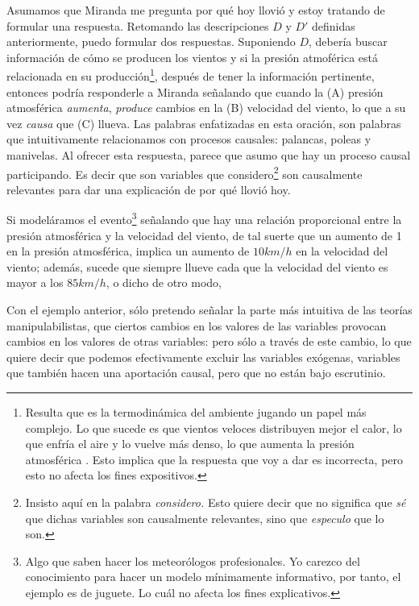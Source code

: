 Asumamos que Miranda me pregunta por qué hoy llovió y estoy
tratando de formular una respuesta. Retomando las
descripciones $ D $ y $ D' $ definidas anteriormente, puedo
formular dos respuestas. Suponiendo $ D $, debería buscar
información de cómo se producen los vientos y si la presión
atmoférica está relacionada en su producción\footnote{
  Resulta que es la termodinámica del ambiente jugando un
  papel más complejo. Lo que sucede es que vientos veloces
  distribuyen mejor el calor, lo que enfría el aire y lo
  vuelve más denso, lo que aumenta la presión atmosférica
  \parencite{Spiridonov2021}. Esto implica que la respuesta
  que voy a dar es incorrecta, pero esto no afecta los fines
  expositivos. 
},
después de tener la información pertinente, entonces podría
responderle a Miranda señalando que cuando la (A) presión
atmosférica \emph{aumenta}, \emph{produce} cambios en la (B)
velocidad del viento, lo que a su vez \emph{causa} que (C)
llueva. Las palabras enfatizadas en esta oración, son
palabras que intuitivamente relacionamos con procesos
causales: palancas, poleas y manivelas. Al ofrecer esta
respuesta, parece que asumo que hay un proceso causal
participando. Es decir que son variables que
considero\footnote{ 
  Insisto aquí en la palabra \emph{considero.} Esto quiere
  decir que no significa que \emph{sé} que dichas variables
  son causalmente relevantes, sino que \emph{especulo} que
  lo son.
} 
son causalmente	relevantes para dar una explicación de por
qué llovió hoy.

Si modeláramos el evento\footnote{
	Algo que saben hacer los meteorólogos profesionales. Yo
	carezco del conocimiento para hacer un modelo mínimamente
	informativo, por tanto, el ejemplo es de juguete. Lo
	cuál  no afecta los fines explicativos. 
} 
señalando que hay una relación proporcional entre la presión
atmosférica y la velocidad del viento, de tal suerte que un
aumento de 1 en la presión atmosférica, implica un aumento
de $ 10km/h $ en la velocidad del viento; además, sucede que
siempre llueve cada que la velocidad del viento es mayor a
los $ 85km/h $, o dicho de otro modo, 

Con el ejemplo anterior, sólo pretendo señalar la parte más
intuitiva de las teorías manipulabilistas, que ciertos
cambios en los valores de las variables provocan cambios en
los valores de otras variables: pero sólo a través de este
cambio, lo que quiere decir que podemos efectivamente
excluir las variables exógenas, variables que también hacen
una aportación causal, pero que no están bajo escrutinio. 

